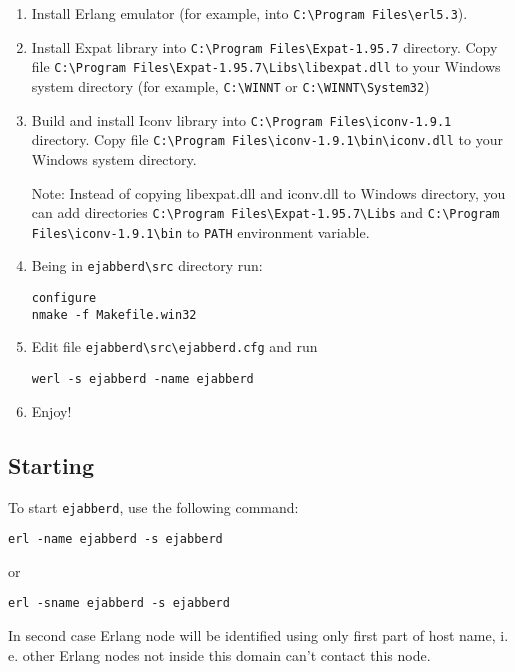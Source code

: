\documentclass[10pt]{article}
\newcommand{\ejabberd}{\texttt{ejabberd}}
\begin{document}
\begin{enumerate}
\item Install Erlang emulator (for example, into \verb|C:\Program Files\erl5.3|).
\item Install Expat library into \verb|C:\Program Files\Expat-1.95.7|
  directory.  Copy file \verb|C:\Program Files\Expat-1.95.7\Libs\libexpat.dll|
  to your Windows system directory (for example, \verb|C:\WINNT| or
  \verb|C:\WINNT\System32|)
\item Build and install Iconv library into \verb|C:\Program Files\iconv-1.9.1| directory.
  Copy file \verb|C:\Program Files\iconv-1.9.1\bin\iconv.dll| to your
  Windows system directory.
  
  Note: Instead of copying libexpat.dll and iconv.dll to Windows
  directory, you can add directories
  \verb|C:\Program Files\Expat-1.95.7\Libs| and
  \verb|C:\Program Files\iconv-1.9.1\bin| to \verb|PATH| environment
  variable.
\item Being in \verb|ejabberd\src| directory run:
\begin{verbatim}
configure
nmake -f Makefile.win32
\end{verbatim}
\item Edit file \verb|ejabberd\src\ejabberd.cfg| and run
\begin{verbatim}
werl -s ejabberd -name ejabberd
\end{verbatim}
\item Enjoy!
\end{enumerate}



\subsection{Starting}
\label{sec:starting}

To start \ejabberd{}, use the following command:
\begin{verbatim}
erl -name ejabberd -s ejabberd
\end{verbatim}
or
\begin{verbatim}
erl -sname ejabberd -s ejabberd
\end{verbatim}
In second case Erlang node will be identified using only first part of host
name, i.\,e. other Erlang nodes not inside this domain can't contact this node.
\end{document}
